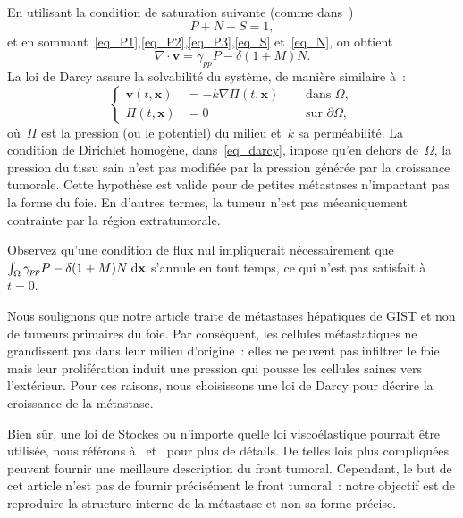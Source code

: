 \documentclass[11pt]{amsart}
\numberwithin{equation}{section}
\newcommand{\dive}{\nabla\cdot}
\newcommand{\muN}{\delta}
\newcommand{\gammapp}{\gamma_{pp}}
\newcommand{\vit}{\mathbf{v}}
\newcommand{\vecx}{\mathbf{x}}
\begin{document}
En utilisant la condition de saturation suivante 
(comme dans~\cite{ambrosi2002})
\begin{equation}\label{eq_saturation}
P+N+S=1,
\end{equation}
et en sommant~\eqref{eq_P1},\eqref{eq_P2},\eqref{eq_P3},\eqref{eq_S} et~\eqref{eq_N},
on obtient 
\begin{equation}\label{eq_divv}
\dive \vit = \gammapp P - \muN (1+M)N.
\end{equation}
La loi de Darcy assure la solvabilité du système, de manière similaire à~\cite{Ribba2006532}:
\begin{equation}\label{eq_darcy}
\left\{
\begin{aligned}
\vit(t,\vecx) &=-k\nabla \Pi(t,\vecx) & \quad \textrm{ dans }  \Omega , \\
\Pi(t,\vecx) &=0 & \quad \textrm{ sur  } \partial \Omega,
\end{aligned}
\right.
\end{equation}
où~$\Pi$ est la pression (ou le potentiel) du milieu et~$k$ sa perméabilité. La condition de Dirichlet homogène, dans~\eqref{eq_darcy}, impose qu'en dehors de~$\Omega$, la pression du tissu sain n'est pas modifiée par la pression générée par la croissance tumorale. Cette hypothèse est valide pour de petites métastases n'impactant pas la forme du foie. En d'autres termes, la tumeur n'est pas mécaniquement contrainte par la région extratumorale. 


Observez qu'une condition de flux nul impliquerait nécessairement que~$\int_{\Omega} \gammapp P - \delta (1+M)N \textrm{\;d}\vecx $ s'annule en tout temps, ce qui n'est pas satisfait à~$t=0$.


Nous soulignons que notre article traite de métastases hépatiques de GIST et non de tumeurs primaires du foie. Par conséquent, les cellules métastatiques ne grandissent pas dans leur milieu d'origine~: elles ne peuvent pas infiltrer le foie mais leur prolifération induit une pression qui pousse les cellules saines vers l'extérieur. Pour ces raisons, nous choisissons une loi de Darcy pour décrire la croissance de la métastase. 


Bien sûr, une loi de Stockes ou n'importe quelle loi viscoélastique pourrait être utilisée, nous référons à~\cite{Bresch2009} et~\cite{ambrosi2002,byrne2003} pour plus de détails. De telles lois plus compliquées peuvent fournir une meilleure description du front tumoral. Cependant, le but de cet article n'est pas de fournir précisément le front tumoral~: notre objectif est de reproduire la structure interne de la métastase et non sa forme précise. 
\end{document}
